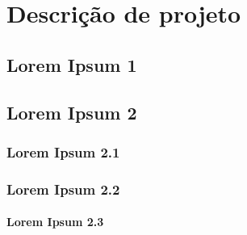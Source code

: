\chapter{Descrição de projeto}

\section{Lorem Ipsum 1}

\lipsum[1-4]

\section{Lorem Ipsum 2}

\lipsum[1-4]

\subsection{Lorem Ipsum 2.1}

\lipsum[1-4]

\subsection{Lorem Ipsum 2.2}

\lipsum[1-4]

\subsubsection{Lorem Ipsum 2.3}

\lipsum[1-4]